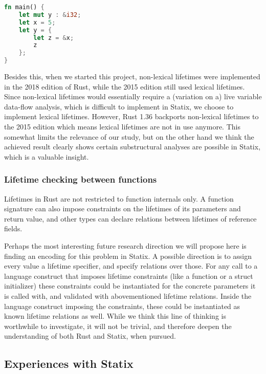 \begin{lstlisting}[language=rust, showstringspaces=false, escapechar=~, label={lst:borrowscope}, caption={Example of returning a borrow}]
fn main() { 
    let mut y : &i32;
    let x = 5; 
    let y = {
        let z = &x;
        z
    };
}
\end{lstlisting}

Besides this, when we started this project, non-lexical lifetimes were implemented in the 2018 edition of Rust, while the 2015 edition still used lexical lifetimes. Since non-lexical lifetimes would essentially require a (variation on a) live variable data-flow analysis, which is difficult to implement in Statix, we choose to implement lexical lifetimes. However, Rust 1.36 backports non-lexical lifetimes to the 2015 edition which means lexical lifetimes are not in use anymore. This somewhat limits the relevance of our study, but on the other hand we think the achieved result clearly shows certain substructural analyses are possible in Statix, which is a valuable insight. 

\subsubsection{Lifetime checking between functions}

Lifetimes in Rust are not restricted to function internals only. A function signature can also impose constraints on the lifetimes of its parameters and return value, and other types can declare relations between lifetimes of reference fields.

Perhaps the most interesting future research direction we will propose here is finding an encoding for this problem in Statix. A possible direction is to assign every value a lifetime specifier, and specify relations over those. For any call to a language construct that imposes lifetime constraints (like a function or a struct initializer) these constraints could be instantiated for the concrete parameters it is called with, and validated with abovementioned lifetime relations. Inside the language construct imposing the constraints, these could be instantiated as known lifetime relations as well. While we think this line of thinking is worthwhile to investigate, it will not be trivial, and therefore deepen the understanding of both Rust and Statix, when pursued.

\subsection{Experiences with Statix}

